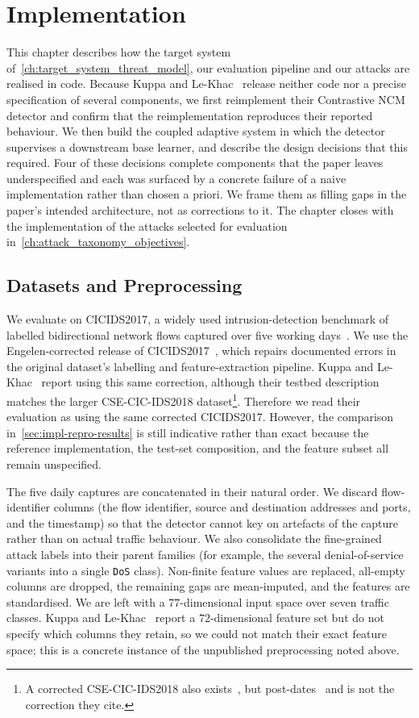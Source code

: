 \chapter{Implementation}
\label{ch:implementation}

This chapter describes how the target system of~\cref{ch:target_system_threat_model}, our evaluation pipeline and our attacks are realised in code. Because Kuppa and Le-Khac~\cite{Kuppa_2022} release neither code nor a precise specification of several components, we first reimplement their Contrastive NCM detector and confirm that the reimplementation reproduces their reported behaviour. We then build the coupled adaptive system in which the detector supervises a downstream base learner, and describe the design decisions that this required. Four of these decisions complete components that the paper leaves underspecified and each was surfaced by a concrete failure of a naive implementation rather than chosen a priori. We frame them as filling gaps in the paper's intended architecture, not as corrections to it. The chapter closes with the implementation of the attacks selected for evaluation in~\cref{ch:attack_taxonomy_objectives}.

\section{Datasets and Preprocessing}
\label{sec:impl-data}
We evaluate on CICIDS2017, a widely used intrusion-detection benchmark of labelled bidirectional network flows captured over five working days~\cite{Sharafaldin_2018}. We use the Engelen-corrected release of CICIDS2017~\cite{Engelen_2021}, which repairs documented errors in the original dataset's labelling and feature-extraction pipeline. Kuppa and Le-Khac~\cite{Kuppa_2022} report using this same correction, although their testbed description matches the larger CSE-CIC-IDS2018 dataset\footnote{A corrected CSE-CIC-IDS2018 also exists~\cite{Liu_2022}, but post-dates~\cite{Kuppa_2022} and is not the correction they cite.}. Therefore we read their evaluation as using the same corrected CICIDS2017. However, the comparison in~\cref{sec:impl-repro-results} is still indicative rather than exact because the reference implementation, the test-set composition, and the feature subset all remain unspecified.

The five daily captures are concatenated in their natural order. We discard flow-identifier columns (the flow identifier, source and destination addresses and ports, and the timestamp) so that the detector cannot key on artefacts of the capture rather than on actual traffic behaviour. We also consolidate the fine-grained attack labels into their parent families (for example, the several denial-of-service variants into a single \texttt{DoS} class). Non-finite feature values are replaced, all-empty columns are dropped, the remaining gaps are mean-imputed, and the features are standardised. We are left with a $77$-dimensional input space over seven traffic classes. Kuppa and Le-Khac~\cite{Kuppa_2022} report a $72$-dimensional feature set but do not specify which columns they retain, so we could not match their exact feature space; this is a concrete instance of the unpublished preprocessing noted above.

